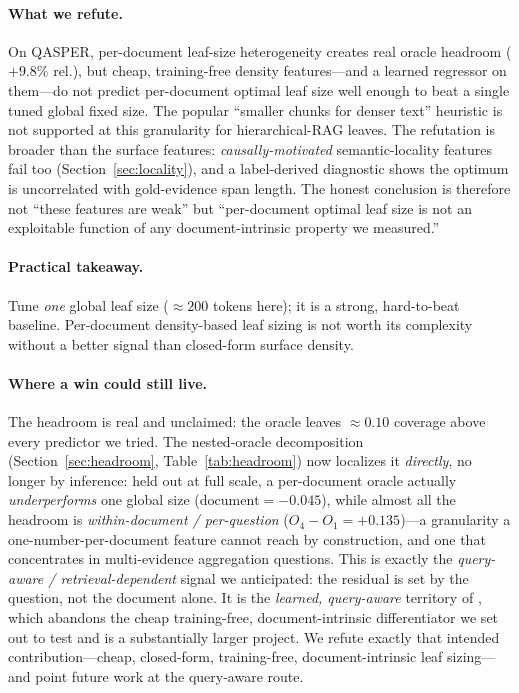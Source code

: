\documentclass[11pt]{article}
\begin{document}
\paragraph{What we refute.} On QASPER, per-document leaf-size heterogeneity
creates real oracle headroom ($+9.8\%$ rel.), but cheap, training-free density
features---and a learned regressor on them---do not predict per-document optimal
leaf size well enough to beat a single tuned global fixed size. The popular
``smaller chunks for denser text'' heuristic is not supported at this granularity
for hierarchical-RAG leaves. The refutation is broader than the surface features:
\emph{causally-motivated} semantic-locality features fail too
(Section~\ref{sec:locality}), and a label-derived diagnostic shows the optimum is
uncorrelated with gold-evidence span length. The honest conclusion is therefore
not ``these features are weak'' but ``per-document optimal leaf size is not an
exploitable function of any document-intrinsic property we measured.''

\paragraph{Practical takeaway.} Tune \emph{one} global leaf size ($\approx 200$
tokens here); it is a strong, hard-to-beat baseline. Per-document density-based
leaf sizing is not worth its complexity without a better signal than closed-form
surface density.

\paragraph{Where a win could still live.} The headroom is real and unclaimed: the
oracle leaves $\approx 0.10$ coverage above every predictor we tried. The
nested-oracle decomposition (Section~\ref{sec:headroom},
Table~\ref{tab:headroom}) now localizes it \emph{directly}, no longer by
inference: held out at full scale, a per-document oracle actually
\emph{underperforms} one global size ($\mathrm{document}=-0.045$), while almost all
the headroom is \emph{within-document / per-question} ($O_4-O_1=+0.135$)---a
granularity a one-number-per-document feature cannot reach by construction, and one
that concentrates in multi-evidence aggregation questions. This is exactly the
\emph{query-aware / retrieval-dependent} signal we anticipated: the residual is set
by the question, not the document alone. It is the \emph{learned, query-aware}
territory of \cite{mog2024,hichunk2025}, which abandons the cheap training-free,
document-intrinsic differentiator we set out to test and is a substantially larger
project. We refute exactly that intended contribution---cheap, closed-form,
training-free, document-intrinsic leaf sizing---and point future work at the
query-aware route.
\end{document}

